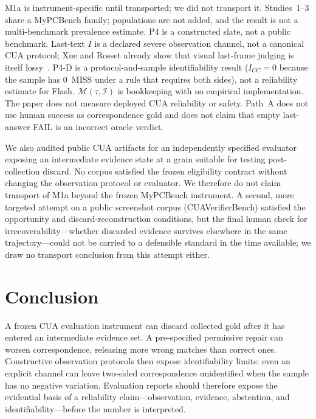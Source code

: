 \documentclass[sigconf,anonymous]{aamas}
\begin{document}
M1a is instrument-specific until transported; we did not transport it.
Studies~1--3 share a MyPCBench family; populations are not added, and the result is not a multi-benchmark prevalence estimate.
P4 is a constructed slate, not a public benchmark.
Last-text $I$ is a declared severe observation channel, not a canonical CUA protocol; Xue and Rosset already show that visual last-frame judging is itself lossy~\citep{xue2025illusion,rosset2026verifiers}.
P4-D is a protocol-and-sample identifiability result ($I_{CC}=0$ because the sample has 0~MISS under a rule that requires both sides), not a reliability estimate for Flash.
$\mathcal{M}(\tau,\mathcal{I})$ is bookkeeping with no empirical implementation.
The paper does not measure deployed CUA reliability or safety.
Path~A does not use human success as correspondence gold and does not claim that empty last-answer FAIL is an incorrect oracle verdict.

We also audited public CUA artifacts for an independently specified evaluator exposing an intermediate evidence state at a grain suitable for testing post-collection discard.
No corpus satisfied the frozen eligibility contract without changing the observation protocol or evaluator.
We therefore do not claim transport of M1a beyond the frozen MyPCBench instrument.
A second, more targeted attempt on a public screenshot corpus (CUAVerifierBench) satisfied the opportunity and discard-reconstruction conditions, but the final human check for irrecoverability---whether discarded evidence survives elsewhere in the same trajectory---could not be carried to a defensible standard in the time available; we draw no transport conclusion from this attempt either.

\section{Conclusion}
\label{sec:conc}

A frozen CUA evaluation instrument can discard collected gold after it has entered an intermediate evidence set.
A pre-specified permissive repair can worsen correspondence, releasing more wrong matches than correct ones.
Constructive observation protocols then expose identifiability limits: even an explicit channel can leave two-sided correspondence unidentified when the sample has no negative variation.
Evaluation reports should therefore expose the evidential basis of a reliability claim---observation, evidence, abstention, and identifiability---before the number is interpreted.



\end{document}
